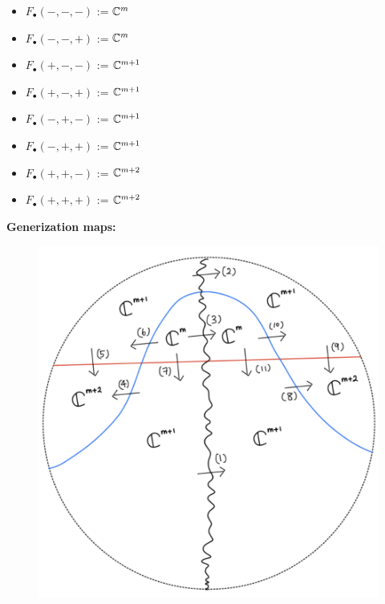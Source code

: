 \begin{itemize}
\item $F_\bullet(-,-,-)$ := $\mathbb{C}^m$
\item $F_\bullet(-,-,+)$ := $\mathbb{C}^m$
\item $F_\bullet(+,-,-)$ := $\mathbb{C}^{m+1}$
\item $F_\bullet(+,-,+)$ := $\mathbb{C}^{m+1}$
\item $F_\bullet(-,+,-)$ := $\mathbb{C}^{m+1}$
\item $F_\bullet(-,+,+)$ := $\mathbb{C}^{m+1}$
\item $F_\bullet(+,+,-)$ := $\mathbb{C}^{m+2}$
\item $F_\bullet(+,+,+)$ := $\mathbb{C}^{m+2}$
\end{itemize}

\textbf{Generization maps:}
\begin{figure}[H]
    \centering
    \includegraphics[scale = 0.45]{diagrams/lemma3/28.png} 
    \caption{}
    \label{fig:your-label}
\end{figure}
